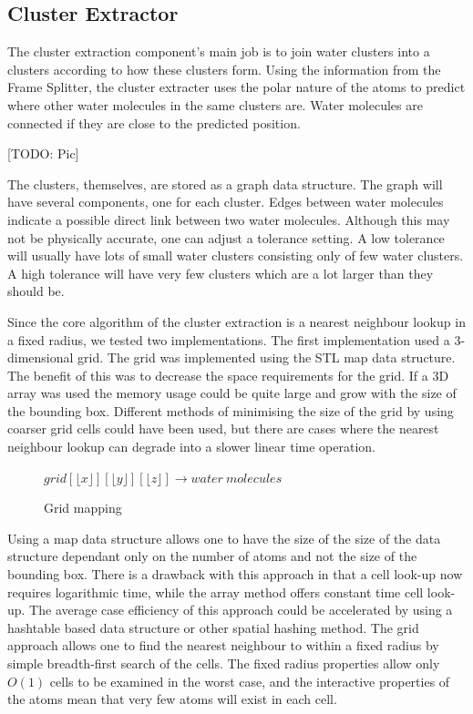 \documentclass[a4paper,11pt]{report}
\begin{document}
\subsection{Cluster Extractor}

The cluster extraction component's main job is to join water clusters into a clusters according to how these clusters form. Using the information from the Frame Splitter, the cluster extracter uses the polar nature of the atoms to predict where other water molecules in the same clusters are. Water molecules are connected if they are close to the predicted position.

[TODO: Pic]

The clusters, themselves, are stored as a graph data structure. The graph will have several components, one for each cluster. Edges between water molecules indicate a possible direct link between two water molecules. Although this may not be physically accurate, one can adjust a tolerance setting. A low tolerance will usually have lots of small water clusters consisting only of few water clusters. A high tolerance will have very few clusters which are a lot larger than they should be.

Since the core algorithm of the cluster extraction is a nearest neighbour lookup in a fixed radius, we tested two implementations. The first implementation used a 3-dimensional grid. The grid was implemented using the STL map data structure. The benefit of this was to decrease the space requirements for the grid. If a 3D array was used the memory usage could be quite large and grow with the size of the bounding box. Different methods of minimising the size of the grid by using coarser grid cells could have been used, but there are cases where the nearest neighbour lookup can degrade into a slower linear time operation.

\begin{figure}[!h]
\begin{center}
 \small
 $grid[\lfloor x\rfloor][\lfloor y\rfloor][\lfloor z\rfloor] \rightarrow water\ molecules$
 \caption{Grid mapping}
\end{center} 
\end{figure}

Using a map data structure allows one to have the size of the size of the data structure dependant only on the number of atoms and not the size of the bounding box. There is a drawback with this approach in that a cell look-up now requires logarithmic time, while the array method offers constant time cell look-up. The average case efficiency of this approach could be accelerated by using a hashtable based data structure or other spatial hashing method. The grid approach allows one to find the nearest neighbour to within a fixed radius by simple breadth-first search of the cells. The fixed radius properties allow only $O(1)$ cells to be examined in the worst case, and the interactive properties of the atoms mean that very few atoms will exist in each cell.
\end{document}
